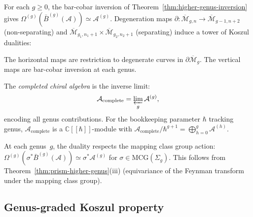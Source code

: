 For each $g \geq 0$, the bar-cobar inversion of Theorem~\ref{thm:higher-genus-inversion}
gives $\Omega^{(g)}(\bar{B}^{(g)}(\mathcal{A})) \simeq \mathcal{A}^{(g)}$.
Degeneration maps $\partial\colon \overline{\mathcal{M}}_{g,n} \to
\overline{\mathcal{M}}_{g-1,n+2}$ (non-separating) and
$\overline{\mathcal{M}}_{g_1,n_1+1} \times \overline{\mathcal{M}}_{g_2,n_2+1}$
(separating) induce a tower of Koszul dualities:
\begin{center}
\end{center}
The horizontal maps are restriction to degenerate curves in $\partial\overline{\mathcal{M}}_g$.
The vertical maps are bar-cobar inversion at each genus.

\begin{definition}\label{def:completed-chiral-algebra}
The \emph{completed chiral algebra} is the inverse limit:
\[
\mathcal{A}_{\mathrm{complete}}
= \varprojlim_g \mathcal{A}^{(g)},
\]
encoding all genus contributions.  For the bookkeeping parameter $\hbar$ tracking genus,
$\mathcal{A}_{\mathrm{complete}}$ is a $\mathbb{C}[\![\hbar]\!]$-module with
$\mathcal{A}_{\mathrm{complete}} / \hbar^{g+1} = \bigoplus_{h=0}^{g} \mathcal{A}^{(h)}$.
\end{definition}

\begin{remark}\label{rem:modular-invariance-tower}
At each genus~$g$, the duality respects the mapping class group action:
$\Omega^{(g)}(\sigma^* \bar{B}^{(g)}(\mathcal{A})) \simeq \sigma^* \mathcal{A}^{(g)}$
for $\sigma \in \mathrm{MCG}(\Sigma_g)$.
This follows from Theorem~\ref{thm:prism-higher-genus}(iii) (equivariance of the
Feynman transform under the mapping class group).
\end{remark}

\subsection{Genus-graded Koszul property}

